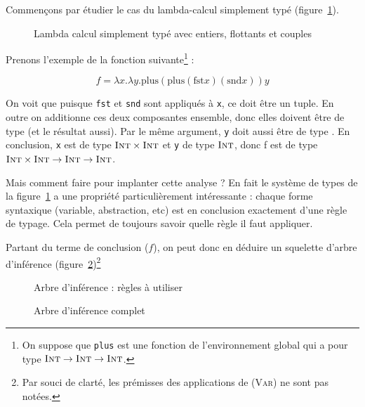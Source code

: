 Commençons par étudier le cas du lambda-calcul simplement typé
(figure~\ref{fig:stlc}).

\begin{figure}



\caption{Lambda calcul simplement typé avec entiers, flottants et couples}
\label{fig:stlc}

\end{figure}

Prenons l'exemple de la fonction suivante\footnote{ On suppose que \texttt{plus}
est une fonction de l'environnement global qui a pour type $\textsc{Int} \rightarrow
\textsc{Int} \rightarrow \textsc{Int}$.} :

\[
f = λx.λy. \textrm{plus} (\textrm{plus} (\textrm{fst} x) (\textrm{snd} x)) y
\]

On voit que puisque \texttt{fst} et \texttt{snd} sont appliqués à \texttt{x}, ce
doit être un tuple. En outre on additionne ces deux composantes ensemble, donc
elles doivent être de type \tInt (et le résultat aussi). Par le même argument,
\texttt{y} doit aussi être de type \tInt. En conclusion, \texttt{x} est de type
$\textsc{Int} \times \textsc{Int}$ et \texttt{y} de type $\textsc{Int}$, donc f est de type $\textsc{Int}
\times \textsc{Int} \rightarrow \textsc{Int} \rightarrow \textsc{Int}$.

Mais comment faire pour implanter cette analyse ? En fait le système de types de
la figure~\ref{fig:stlc} a une propriété particulièrement intéressante : chaque
forme syntaxique (variable, abstraction, etc) est en conclusion exactement d'une
règle de typage. Cela permet de toujours savoir quelle règle il faut appliquer.

Partant du terme de conclusion ($f$), on peut donc en déduire un squelette
d'arbre d'inférence (figure~\ref{fig:inftree-rules})\footnote{Par souci de
clarté, les prémisses des applications de \textsc{(Var)} ne sont pas notées.}

\begin{figure} %
\def\disptypeL#1{}
\def\disptypeR#1{}



\caption{Arbre d'inférence : règles à utiliser}
\label{fig:inftree-rules}
\end{figure} %

\begin{figure} %
\def\disptypeL#1{:#1}
\def\disptypeR#1{:#1}



\caption{Arbre d'inférence complet}
\label{fig:inftree-full}
\end{figure} %

